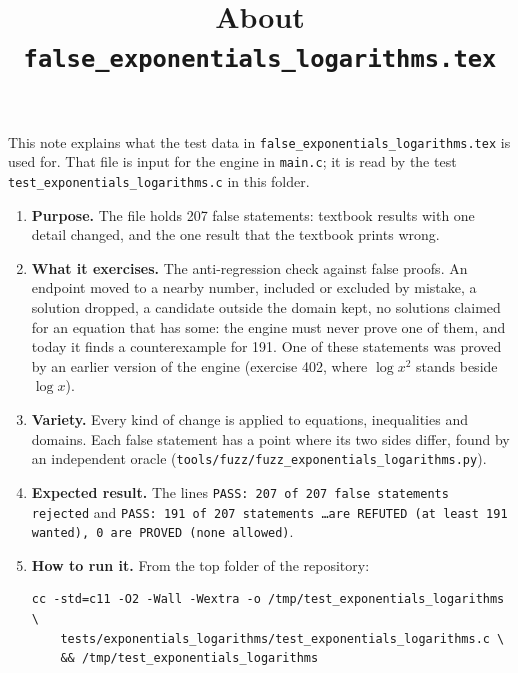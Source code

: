 \documentclass[11pt,a4paper]{article}
\title{About \texttt{false\_exponentials\_logarithms.tex}}
\author{}
\date{}
\begin{document}
\maketitle
This note explains what the test data in \texttt{false\_exponentials\_logarithms.tex} is used for. That file is input for the engine in \texttt{main.c}; it is read by the test \texttt{test\_exponentials\_logarithms.c} in this folder.

\begin{enumerate}
\item \textbf{Purpose.} The file holds 207 false statements: textbook results with one detail changed, and the one result that the textbook prints wrong.

\item \textbf{What it exercises.} The anti-regression check against false proofs. An endpoint moved to a nearby number, included or excluded by mistake, a solution dropped, a candidate outside the domain kept, no solutions claimed for an equation that has some: the engine must never prove one of them, and today it finds a counterexample for 191. One of these statements was proved by an earlier version of the engine (exercise 402, where $\log x^{2}$ stands beside $\log x$).

\item \textbf{Variety.} Every kind of change is applied to equations, inequalities and domains. Each false statement has a point where its two sides differ, found by an independent oracle (\texttt{tools/fuzz/fuzz\_exponentials\_logarithms.py}).

\item \textbf{Expected result.} The lines \texttt{PASS: 207 of 207 false statements rejected} and \texttt{PASS: 191 of 207 statements \ldots are REFUTED (at least 191 wanted), 0 are PROVED (none allowed)}.

\item \textbf{How to run it.} From the top folder of the repository:
\begin{verbatim}
cc -std=c11 -O2 -Wall -Wextra -o /tmp/test_exponentials_logarithms \
    tests/exponentials_logarithms/test_exponentials_logarithms.c \
    && /tmp/test_exponentials_logarithms
\end{verbatim}
\end{enumerate}
\end{document}
